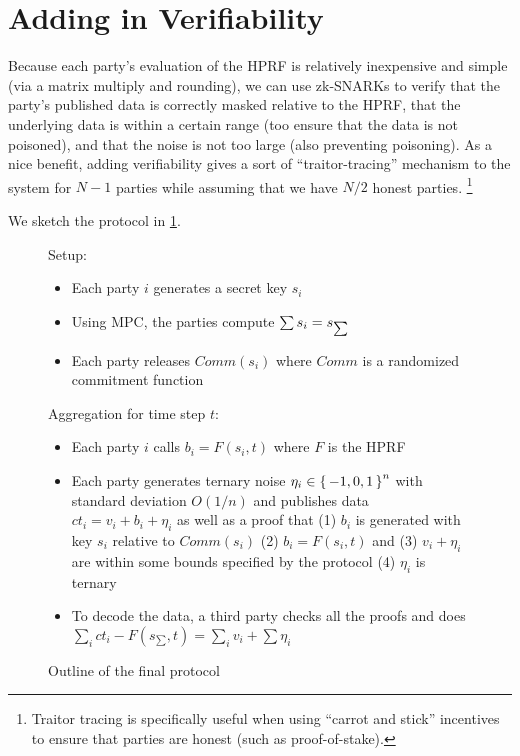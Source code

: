 \section{Adding in Verifiability}
Because each party's evaluation of the HPRF is relatively inexpensive and simple (via a matrix multiply and rounding), we can use zk-SNARKs to verify that the party's published data is correctly masked relative to the HPRF, that the underlying data is within a certain range (too ensure that the data is not poisoned), and that the noise is not too large (also preventing poisoning).
As a nice benefit, adding verifiability gives a sort of ``traitor-tracing'' mechanism to the system for $N - 1$ parties while assuming that we have $N /2$ honest parties.
\footnote{Traitor tracing is specifically useful when using ``carrot and stick'' incentives to ensure that parties are honest (such as proof-of-stake).}

We sketch the protocol in \cref{fig:prot}.


\begin{figure}[H]
	\begin{mdframed}
		Setup: \begin{itemize}
			\item Each party $i$ generates a secret key $s_i$
			\item Using MPC, the parties compute $\sum s_i = s_{\sum}$
			\item Each party releases $Comm(s_i)$ where $Comm$ is a randomized commitment function
		\end{itemize}
		Aggregation for time step $t$: \begin{itemize}
			\item Each party $i$ calls $b_i = F(s_i, t)$  where $F$ is the HPRF
			\item Each party generates ternary noise $\eta_i \in \set{-1, 0, 1}^n$ with standard deviation $O(1/n)$ and publishes data $ct_i = v_i + b_i + \eta_i$ as well as a proof that (1) $b_i$ is generated with key $s_i$ relative to $Comm(s_i)$ (2) $b_i = F(s_i, t)$ and (3) $v_i + \eta_i$ are within some bounds specified by the protocol (4) $\eta_i$ is ternary
			\item To decode the data, a third party checks all the proofs and does $\sum_i ct_i - F(s_{\sum}, t) = \sum_i v_i + \sum \eta_i$
		\end{itemize}
	\end{mdframed}
	\caption{Outline of the final protocol}
	\label{fig:prot}
\end{figure}


